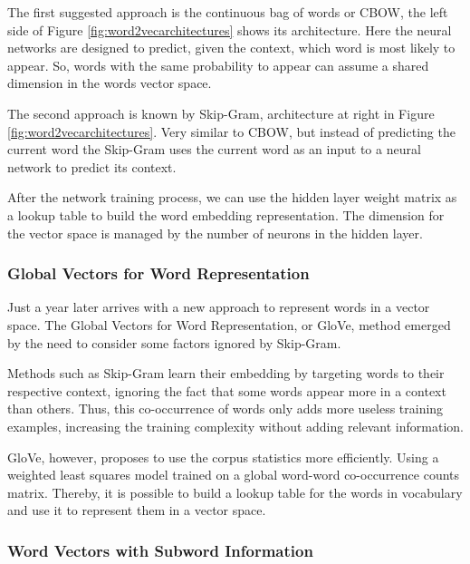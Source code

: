 	The first suggested approach is the continuous bag of words or CBOW, the left side of Figure \ref{fig:word2vecarchitectures} shows its architecture. Here the neural networks are designed to predict, given the context, which word is most likely to appear. So, words with the same probability to appear can assume a shared dimension in the words vector space.

	The second approach is known by Skip-Gram, architecture at right in Figure \ref{fig:word2vecarchitectures}. Very similar to CBOW, but instead of predicting the current word the Skip-Gram uses the current word as an input to a neural network to predict its context.

	After the network training process, we can use the hidden layer weight matrix as a lookup table to build the word embedding representation. The dimension for the vector space is managed by the number of neurons in the hidden layer.


	\subsubsection{Global Vectors for Word Representation} %

	Just a year later  arrives with a new approach to represent words in a vector space. The Global Vectors for Word Representation, or GloVe, method emerged by the need to consider some factors ignored by Skip-Gram.

	Methods such as Skip-Gram learn their embedding by targeting words to their respective context, ignoring the fact that some words appear more in a context than others. Thus, this co-occurrence of words only adds more useless training examples, increasing the training complexity without adding relevant information.

	GloVe, however, proposes to use the corpus statistics more efficiently. Using a weighted least squares model trained on a global word-word co-occurrence counts matrix. Thereby, it is possible to build a lookup table for the words in vocabulary and use it to represent them in a vector space.


	\subsubsection{Word Vectors with Subword Information}

